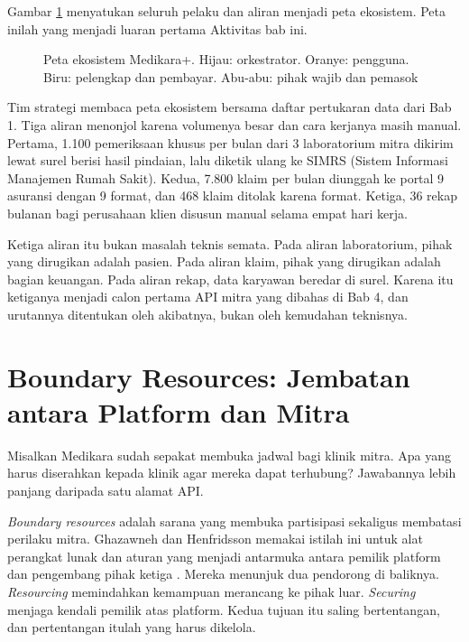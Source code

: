 Gambar \ref{fig:ch03-peta-ekosistem} menyatukan seluruh pelaku dan aliran menjadi peta ekosistem. Peta
inilah yang menjadi luaran pertama Aktivitas bab ini.

\begin{figure}[!htb]
  \centering
  
  \caption{Peta ekosistem Medikara+. Hijau: orkestrator. Oranye: pengguna. Biru: pelengkap dan
           pembayar. Abu-abu: pihak wajib dan pemasok}
  \label{fig:ch03-peta-ekosistem}
\end{figure}

\begin{kasus}[title={Kasus Medikara Health: Tiga Sambungan Terlemah}]
Tim strategi membaca peta ekosistem bersama daftar pertukaran data dari Bab 1. Tiga aliran menonjol
karena volumenya besar dan cara kerjanya masih manual. Pertama, 1.100 pemeriksaan khusus per bulan dari 3 laboratorium mitra dikirim lewat surel berisi hasil
pindaian, lalu diketik ulang ke SIMRS (Sistem Informasi Manajemen Rumah Sakit). Kedua, 7.800 klaim per
bulan diunggah ke portal 9 asuransi dengan 9 format, dan 468 klaim ditolak karena format. Ketiga, 36
rekap bulanan bagi perusahaan klien disusun manual selama empat hari kerja.

Ketiga aliran itu bukan masalah teknis semata. Pada aliran laboratorium, pihak yang dirugikan adalah
pasien. Pada aliran klaim, pihak yang dirugikan adalah bagian keuangan. Pada aliran rekap, data
karyawan beredar di surel. Karena itu ketiganya menjadi calon pertama API mitra yang dibahas di Bab 4,
dan urutannya ditentukan oleh akibatnya, bukan oleh kemudahan teknisnya.
\end{kasus}

\section{Boundary Resources: Jembatan antara Platform dan Mitra}

Misalkan Medikara sudah sepakat membuka jadwal bagi klinik mitra. Apa yang harus diserahkan kepada
klinik agar mereka dapat terhubung? Jawabannya lebih panjang daripada satu alamat API.

\textit{Boundary resources} adalah sarana yang membuka partisipasi sekaligus membatasi perilaku mitra.
Ghazawneh dan Henfridsson memakai istilah ini untuk alat perangkat lunak dan aturan yang menjadi
antarmuka antara pemilik platform dan pengembang pihak ketiga \cite{ghazawneh2013boundary}. Mereka
menunjuk dua pendorong di baliknya. \textit{Resourcing} memindahkan kemampuan merancang ke pihak luar.
\textit{Securing} menjaga kendali pemilik atas platform. Kedua tujuan itu saling bertentangan, dan
pertentangan itulah yang harus dikelola.

